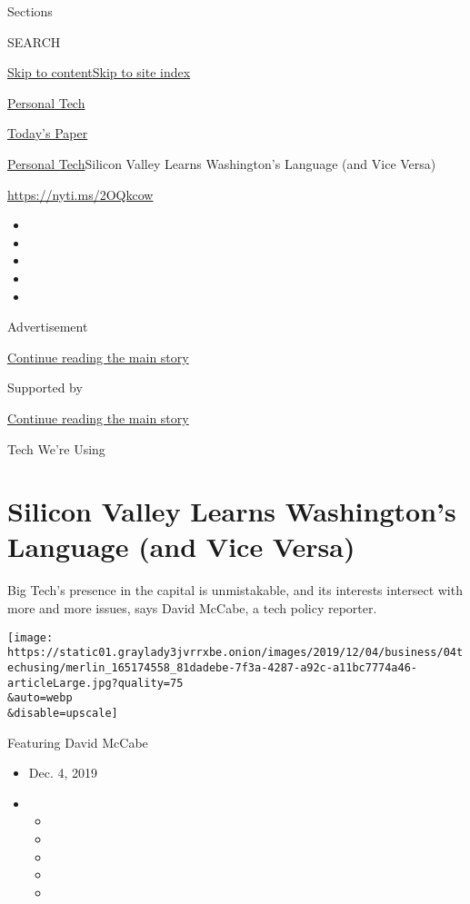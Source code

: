 Sections

SEARCH

\protect\hyperlink{site-content}{Skip to
content}\protect\hyperlink{site-index}{Skip to site index}

\href{https://www.nytimes3xbfgragh.onion/section/technology/personaltech}{Personal
Tech}

\href{https://myaccount.nytimes3xbfgragh.onion/auth/login?response_type=cookie\&client_id=vi}{}

\href{https://www.nytimes3xbfgragh.onion/section/todayspaper}{Today's
Paper}

\href{/section/technology/personaltech}{Personal Tech}\textbar{}Silicon
Valley Learns Washington's Language (and Vice Versa)

\url{https://nyti.ms/2OQkcow}

\begin{itemize}
\item
\item
\item
\item
\item
\end{itemize}

Advertisement

\protect\hyperlink{after-top}{Continue reading the main story}

Supported by

\protect\hyperlink{after-sponsor}{Continue reading the main story}

Tech We're Using

\hypertarget{silicon-valley-learns-washingtons-language-and-vice-versa}{%
\section{Silicon Valley Learns Washington's Language (and Vice
Versa)}\label{silicon-valley-learns-washingtons-language-and-vice-versa}}

Big Tech's presence in the capital is unmistakable, and its interests
intersect with more and more issues, says David McCabe, a tech policy
reporter.

\texttt{[image: https://static01.graylady3jvrrxbe.onion/images/2019/12/04/business/04techusing/merlin\_165174558\_81dadebe-7f3a-4287-a92c-a11bc7774a46-articleLarge.jpg?quality=75\\\&auto=webp\\\&disable=upscale]}

Featuring David McCabe

\begin{itemize}
\item
  Dec. 4, 2019
\item
  \begin{itemize}
  \item
  \item
  \item
  \item
  \item
  \end{itemize}
\end{itemize}

